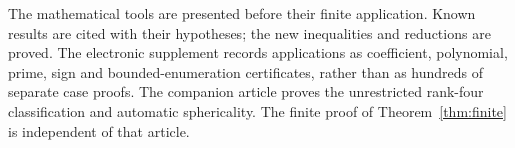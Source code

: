 The mathematical tools are presented before their finite application. Known
results are cited with their hypotheses; the new inequalities and reductions
are proved. The electronic supplement records applications as coefficient,
polynomial, prime, sign and bounded-enumeration certificates, rather than as
hundreds of separate case proofs. The companion article proves the
unrestricted rank-four classification and automatic sphericality. The
finite proof of Theorem~\ref{thm:finite} is independent of that article.
